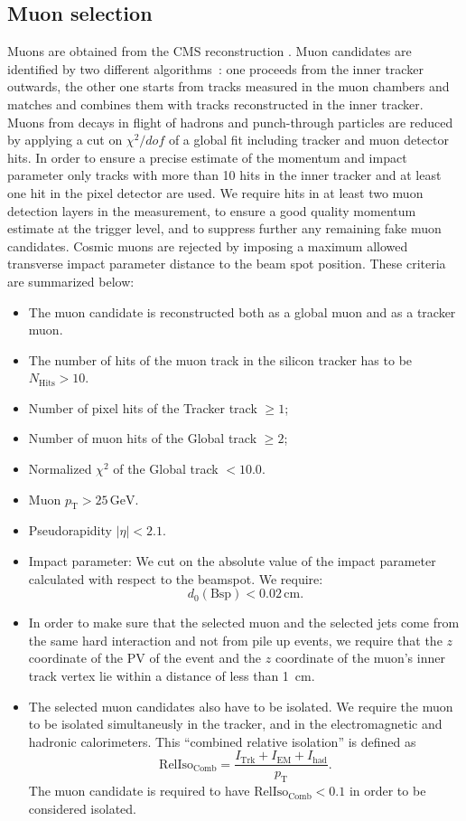 \subsection{Muon selection}
\label{sec:muon_cuts}
Muons are obtained from the CMS reconstruction \cite{MUONPAS}.
Muon candidates are identified by two different 
algorithms~\cite{MUONPAS}: one proceeds from the inner tracker outwards, 
the other one starts from tracks measured in the muon chambers and matches 
and combines them with tracks reconstructed in the inner tracker. 
Muons from decays in flight of hadrons and punch-through particles are 
reduced by applying a cut on $\chi^2/dof$
of a global fit including tracker and muon detector hits.
In order to ensure a precise estimate of the momentum and impact parameter
only tracks with more than 10 hits in the inner tracker and at least 
one hit in the pixel detector are used.
We require hits in at least two muon detection layers in the measurement,
to ensure a good quality momentum estimate at the trigger level, and
to suppress further any remaining fake muon candidates.
Cosmic muons are rejected by imposing a maximum allowed transverse impact parameter 
distance to the beam spot position.
These criteria are summarized below:
\begin{itemize}
\item The muon candidate is reconstructed both as a global muon and
as a tracker muon.
\item The number of hits of the muon track in the silicon tracker has
to be $N_{\mathrm{Hits}} > 10$.
\item Number of pixel hits of the Tracker track $\ge 1$;
\item Number of muon hits of the Global track $\ge 2$;
\item Normalized $\chi^{2}$ of the Global track $< 10.0$.
\item Muon $p_{\mathrm{T}} > 25\,\mathrm{GeV}$.
\item Pseudorapidity $|\eta| < 2.1$.
\item Impact parameter: We cut on the absolute value of the impact
parameter calculated with respect to the beamspot. We require:
\begin{equation*}
 d_0(\mathrm{Bsp}) < 0.02\,\mathrm{cm}.
\end{equation*}
\item In order to make sure that the selected muon and the selected
jets come from the same hard interaction and not from pile up events,
we require that the $z$ coordinate of the PV of the event and the $z$
coordinate of the muon's inner track vertex lie within a distance of
less than 1~cm.
\item The selected muon candidates also have to be isolated.
We require the muon to be isolated simultaneusly in the
tracker, and in the electromagnetic and hadronic calorimeters.  
This ``combined relative isolation'' is defined as
\begin{equation*}
\mathrm{RelIso_{\mathrm{Comb}}} = \frac{I_{\mathrm{Trk}}+I_{\mathrm{EM}}+I_{\mathrm{had}}}{p_\mathrm{T}}.
\end{equation*} 
The muon candidate is required to have
$\mathrm{RelIso_{\mathrm{Comb}}} < 0.1$ in order to be considered
isolated.
\end{itemize}

